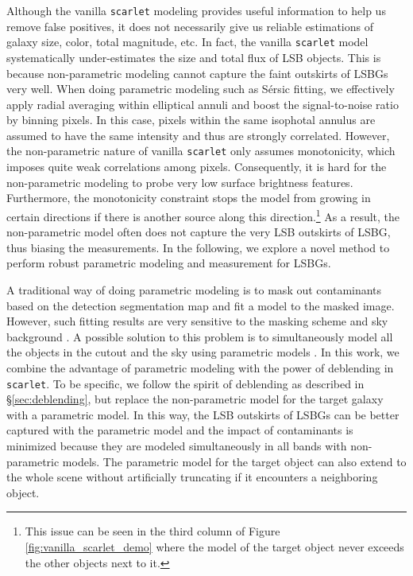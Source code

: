 \documentclass[twocolumn,astrosymb,twocolappendix]{aastex631}
\newcommand{\code}[1]{\texttt{#1}}
\newcommand{\sersic}{S\'ersic}
\begin{document}
\begin{CJK*}{UTF8}{gbsn}
Although the vanilla \code{scarlet} modeling provides useful information to help us remove false positives, it does not necessarily give us reliable estimations of galaxy size, color, total magnitude, etc. In fact, the vanilla \code{scarlet} model systematically under-estimates the size and total flux of LSB objects. 
This is because non-parametric modeling cannot capture the faint outskirts of LSBGs very well. When doing parametric modeling such as \sersic{} fitting, we effectively apply radial averaging within elliptical annuli and boost the signal-to-noise ratio by binning pixels. In this case, pixels within the same isophotal annulus are assumed to have the same intensity and thus are strongly correlated. However, the non-parametric nature of vanilla \code{scarlet} only assumes monotonicity, which imposes quite weak correlations among pixels. Consequently, it is hard for the non-parametric modeling to probe very low surface brightness features. Furthermore, the monotonicity constraint stops the model from growing in certain directions if there is another source along this direction.\footnote{This issue can be seen in the third column of Figure \ref{fig:vanilla_scarlet_demo} where the model of the target object never exceeds the other objects next to it.} As a result, the non-parametric model often does not capture the very LSB outskirts of LSBG, thus biasing the measurements. In the following, we explore a novel method to perform robust parametric modeling and measurement for LSBGs.

A traditional way of doing parametric modeling is to mask out contaminants based on the detection segmentation map and fit a model to the masked image. However, such fitting results are very sensitive to the masking scheme and sky background \citep[e.g.,][]{Greco2018}. A possible solution to this problem is to simultaneously model all the objects in the cutout and the sky using parametric models \citep[e.g.,][]{Lang2016,Dey2019,Liu2022}. In this work, we combine the advantage of parametric modeling with the power of deblending in \code{scarlet}. To be specific, we follow the spirit of deblending as described in \S\ref{sec:deblending}, but replace the non-parametric model for the target galaxy with a parametric model. In this way, the LSB outskirts of LSBGs can be better captured with the parametric model and the impact of contaminants is minimized because they are modeled simultaneously in all bands with non-parametric models. The parametric model for the target object can also extend to the whole scene without artificially truncating if it encounters a neighboring object. 


\end{CJK*}
\end{document}
